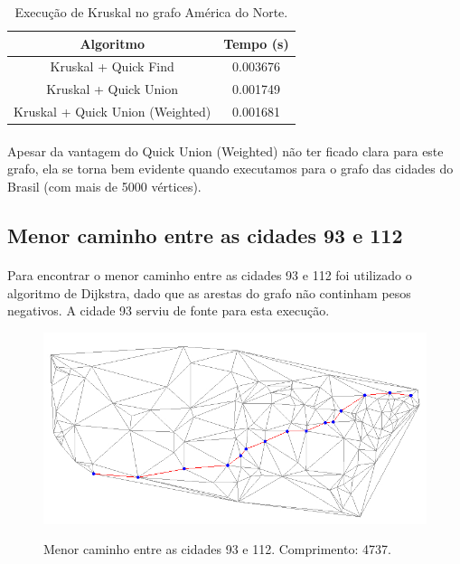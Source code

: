 \documentclass[11pt,a4paper]{article}
\begin{document}
        \begin{table}[htb!]
        \centering
            \begin{tabular}{|c|c|}
            \toprule
            Algoritmo                         & Tempo (s)\\
            \midrule
            Kruskal + Quick Find              & 0.003676 \\
            Kruskal + Quick Union             & 0.001749 \\
            Kruskal + Quick Union (Weighted)  & 0.001681 \\
            \bottomrule
            \end{tabular}
            \caption{Execução de Kruskal no grafo América do Norte.}
        \end{table}
        
        \paragraph{}
        Apesar da vantagem do Quick Union (Weighted) não ter ficado clara para este grafo, ela se torna bem evidente quando executamos para o grafo das cidades do Brasil (com mais de 5000 vértices).

        \subsection{Menor caminho entre as cidades 93 e 112}
        \paragraph{}
        Para encontrar o menor caminho entre as cidades 93 e 112 foi utilizado o algoritmo de Dijkstra, dado que as arestas do grafo não continham pesos negativos. A cidade 93 serviu de fonte para esta execução. 

        \begin{figure}[htb!]
          \centering
              \captionsetup{justification=centering}  
              \includegraphics[scale=0.5]{map93-112}
              \label{fig:map93112}
              \caption{Menor caminho entre as cidades 93 e 112. Comprimento: 4737.}
        \end{figure}
\end{document}
